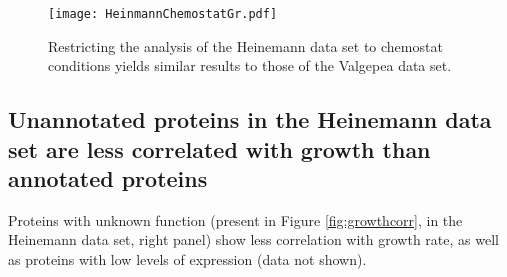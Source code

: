 \documentclass[notitlepage]{article}
\begin{document}
\begin{figure}[h]
\centering
\texttt{[image: HeinmannChemostatGr.pdf]}
\caption{
  Restricting the analysis of the Heinemann data set to chemostat conditions yields similar results to those of the Valgepea data set.
}
\label{fig:growthcorrchemo}
\end{figure}
\subsection{Unannotated proteins in the Heinemann data set are less correlated with growth than annotated proteins}
Proteins with unknown function (present in Figure \ref{fig:growthcorr}, in the Heinemann data set, right panel) show less correlation with growth rate, as well as proteins with low levels of expression (data not shown).

\printbibliography
\end{document}
